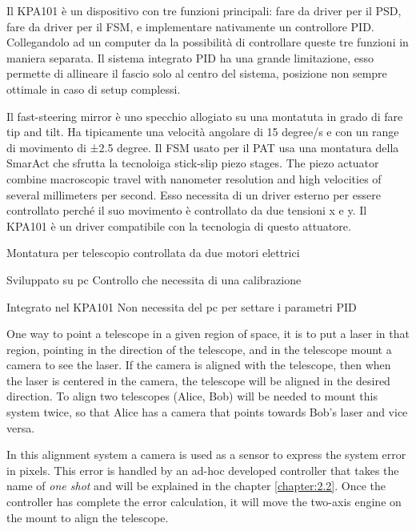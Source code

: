 Il KPA101 è un dispositivo con tre funzioni principali: fare da driver per il PSD, fare da driver per il FSM, e implementare nativamente un controllore PID. Collegandolo ad un computer da la possibilità di controllare queste tre funzioni in maniera separata. Il sistema integrato PID ha una grande limitazione, esso permette di allineare il fascio solo al centro del sistema, posizione non sempre ottimale in caso di setup complessi.


Il fast-steering mirror è uno specchio allogiato su una montatuta in grado di fare tip and tilt. Ha tipicamente una velocità angolare di 15 degree/s e con un range di movimento di ±2.5 degree. Il FSM usato per il PAT usa una montatura della SmarAct che sfrutta la tecnoloiga stick-slip piezo stages. The piezo actuator combine macroscopic travel with nanometer resolution and high velocities of several millimeters per second. Esso necessita di un driver esterno per essere controllato perché il suo movimento è controllato da due tensioni x e y. Il KPA101 è un driver compatibile con la tecnologia di questo attuatore.

Montatura per telescopio controllata da due motori elettrici

Sviluppato su pc
Controllo che necessita di una calibrazione

Integrato nel KPA101
Non necessita del pc per settare i parametri PID

One way to point a telescope in a given region of space, it is to put a laser in that region, pointing in the direction of the telescope, and in the telescope mount a camera to see the laser.
If the camera is aligned with the telescope, then when the laser is centered in the camera, the telescope will be aligned in the desired direction.
To align two telescopes (Alice, Bob) will be needed to mount this system twice, so that Alice has a camera that points towards Bob’s laser and vice versa.

In this alignment system a camera is used as a sensor to express the system error in pixels. This error is handled by an ad-hoc developed controller that takes the name of \textit{one shot} and will be explained in the chapter \ref{chapter:2.2}. Once the controller has complete the error calculation, it will move the two-axis engine on the mount to align the telescope.

